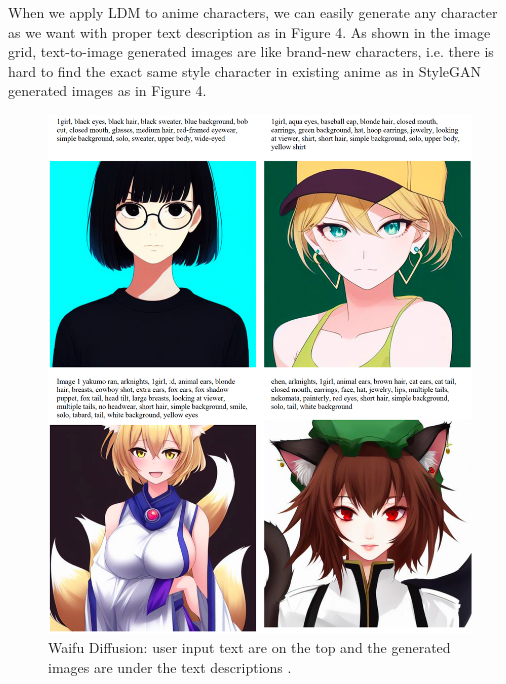 When we apply LDM to anime characters,
we can easily generate any character as we want with proper text description as in Figure 4.
As shown in the image grid,
text-to-image generated images are like brand-new characters,
i.e. there is hard to find the exact same style character in existing anime as in StyleGAN generated images as in Figure 4.
\begin{figure}[]
    \begin{center}
    \includegraphics[width=\textwidth]{img/waifu_diffusion.png}
    \end{center}
    \caption{
        Waifu Diffusion:
        user input text are on the top
        and the generated images are under the text descriptions \cite{WaifuDiffusion}.
    }
\end{figure}

\newpage